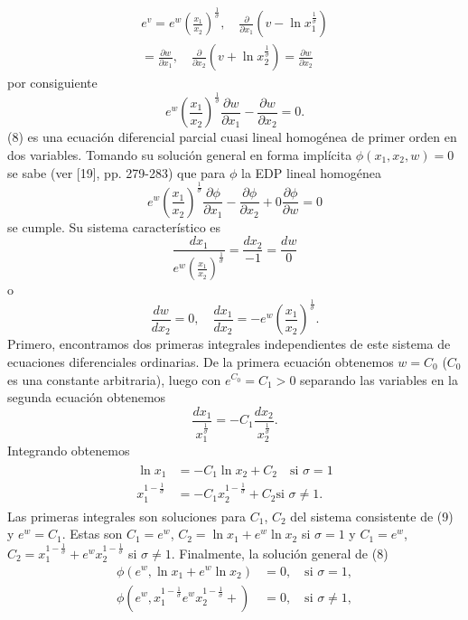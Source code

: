 \documentclass[a4paper,fleqn]{cas-dc}
\begin{document}
\begin{multline*}
e^{v}=e^{w}{\left(\frac{x_{1}}{x_{2}}\right)}^{\frac{1}{\sigma}},\quad\frac{\partial}{\partial x_{1}}\left(v-\ln x^{\frac{1}{\sigma}}_{1}\right)\\
=\frac{\partial w}{\partial x_{1}},\quad\frac{\partial}{\partial x_{2}}\left(v+\ln x^{\frac{1}{\sigma}}_{2}\right)=\frac{\partial w}{\partial x_{2}}
\end{multline*}
por consiguiente
\begin{equation}
e^{w}{\left(\frac{x_{1}}{x_{2}}\right)}^{\frac{1}{\sigma}}\frac{\partial w}{\partial x_{1}}-\frac{\partial w}{\partial x_{2}}=0.
\end{equation}
(8) es una ecuación diferencial parcial cuasi lineal homogénea de primer orden en dos variables. Tomando su solución general en forma implícita $\phi\left(x_{1},x_{2},w\right)=0$ se sabe (ver [19], pp. 279-283) que para $\phi$ la EDP lineal homogénea \[ e^{w}{\left(\dfrac{x_{1}}{x_{2}}\right)}^{\frac{1}{\sigma}}\frac{\partial\phi}{\partial x_{1}}-\frac{\partial\phi}{\partial x_{2}}+0\frac{\partial\phi}{\partial w}=0 \]
se cumple. Su sistema característico es \[ \frac{dx_{1}}{e^{w}{\left(\frac{x_{1}}{x_{2}}\right)}^{\frac{1}{\sigma}}}=\dfrac{dx_{2}}{-1}=\frac{dw}{0} \] o \[ \frac{dw}{dx_{2}}=0,\quad\frac{dx_{1}}{dx_{2}}=-e^{w}{\left(\frac{x_{1}}{x_{2}}\right)}^{\frac{1}{\sigma}}. \] Primero, encontramos dos primeras integrales independientes de este sistema de ecuaciones diferenciales ordinarias. De la primera ecuación obtenemos $w=C_{0}$ ($C_{0}$ es una constante arbitraria), luego con $e^{C_{0}}=C_{1}>0$ separando las variables en la segunda ecuación obtenemos \[ \frac{dx_{1}}{x^{\frac{1}{\sigma}}_{1}}=-C_{1}\frac{dx_{2}}{x^{\frac{1}{\sigma}}_{2}}. \] Integrando obtenemos
\begin{align}
\begin{split}
\ln x_{1}&=-C_{1}\ln x_{2}+C_{2}\quad\text{si }\sigma=1\\
x^{1-\frac{1}{\sigma}}_{1}&=-C_{1}x^{1-\frac{1}{\sigma}}_{2}+C_{2}\text{si }\sigma\neq1.
\end{split}
\end{align}
Las primeras integrales son soluciones para $C_{1}$, $C_{2}$ del sistema consistente de (9) y $e^{w}=C_{1}$. Estas son $C_{1}=e^{w}$, $C_{2}=\ln x_{1}+e^{w}\ln x_{2}$ si $\sigma=1$ y $C_{1}=e^{w}$, $C_{2}=x^{1-\frac{1}{\sigma}}_{1}+e^{w}x^{1-\frac{1}{\sigma}}_{2}$ si $\sigma\neq1$. Finalmente, la solución general de (8)
\begin{align*}
\phi\left(e^{w},\ln x_{1}+e^{w}\ln x_{2}\right)&=0,\quad\text{si }\sigma=1,\\
\phi\left(e^{w},x^{1-\frac{1}{\sigma}}_{1}e^{w}x^{1-\frac{1}{\sigma}}_{2}+\right)&=0,\quad\text{si }\sigma\neq1,
\end{align*}
\end{document}
